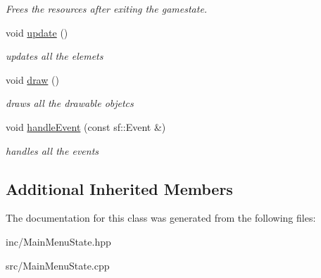 \begin{DoxyCompactItemize}
\begin{DoxyCompactList}\small\item\em Frees the resources after exiting the gamestate. \end{DoxyCompactList}\item 
\hypertarget{class_main_menu_state_abfcd707456d4e9cf26e1a1925f1094a8}{void \hyperlink{class_main_menu_state_abfcd707456d4e9cf26e1a1925f1094a8}{update} ()}\label{class_main_menu_state_abfcd707456d4e9cf26e1a1925f1094a8}

\begin{DoxyCompactList}\small\item\em updates all the elemets \end{DoxyCompactList}\item 
\hypertarget{class_main_menu_state_a38804fb6a79b34f4884c2b0da38c7fc3}{void \hyperlink{class_main_menu_state_a38804fb6a79b34f4884c2b0da38c7fc3}{draw} ()}\label{class_main_menu_state_a38804fb6a79b34f4884c2b0da38c7fc3}

\begin{DoxyCompactList}\small\item\em draws all the drawable objetcs \end{DoxyCompactList}\item 
\hypertarget{class_main_menu_state_a1d9b528a953cc09987f6ec126effab8c}{void \hyperlink{class_main_menu_state_a1d9b528a953cc09987f6ec126effab8c}{handle\+Event} (const sf\+::\+Event \&)}\label{class_main_menu_state_a1d9b528a953cc09987f6ec126effab8c}

\begin{DoxyCompactList}\small\item\em handles all the events \end{DoxyCompactList}\end{DoxyCompactItemize}
\subsection*{Additional Inherited Members}


The documentation for this class was generated from the following files\+:\begin{DoxyCompactItemize}
\item 
inc/Main\+Menu\+State.\+hpp\item 
src/Main\+Menu\+State.\+cpp\end{DoxyCompactItemize}
